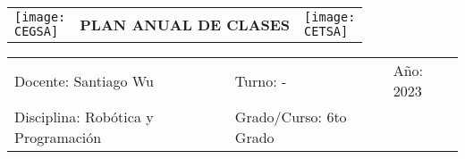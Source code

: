 \documentclass[landscape, a4paper, 10pt]{article}
\newcommand{\profesor}{Santiago Wu}
\newcommand{\discipline}{Robótica y Programación}
\newcommand{\currentyear}{2023}
\newcommand{\CEGSA}{cegsa-logo.png}
\newcommand{\CETSA}{cetsa-logo.png}
\begin{document}
	\pagebreak[4]
	\begin{tabularx}{\textwidth}{ >{\raggedright\arraybackslash}X >{\centering\arraybackslash}X >{\raggedleft\arraybackslash}X }
		\texttt{[image: \\CEGSA]} &
		\textbf{PLAN ANUAL DE CLASES} &
		\texttt{[image: \\CETSA]}
	\end{tabularx}
	\begin{tabularx}{\textwidth}{ >{\raggedright\arraybackslash}X >{\raggedright\arraybackslash}X >{\raggedright\arraybackslash}X }
		Docente: \profesor &
		Turno: - &
		Año: \currentyear \\
		Disciplina: \discipline &
		Grado/Curso: 6to Grado &
		 \\
	\end{tabularx}
	\centering
\end{document}
